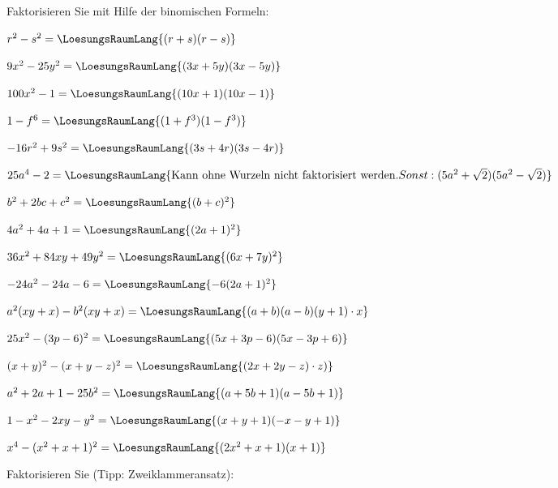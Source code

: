 

Faktorisieren Sie mit Hilfe der binomischen Formeln:


\begin{bbwAufgabenBlock}
\item $r^2-s^2 = \LoesungsRaumLang{(r+s)(r-s)}$
\item $9x^2 - 25y^2 = \LoesungsRaumLang{(3x+5y)(3x-5y)}$
\item $100x^2 -1 = \LoesungsRaumLang{(10x+1)(10x-1)}$
\item $1-f^6 = \LoesungsRaumLang{(1+f^3)(1-f^3)}$
\item $-16r^2 + 9s^2 = \LoesungsRaumLang{(3s+4r)(3s-4r)}$
\item $25a^4-2 =  \LoesungsRaumLang{\textrm{Kann ohne Wurzeln nicht faktorisiert werden}. Sonst: (5a^2 + \sqrt{2})(5a^2-\sqrt{2})}$
\item $b^2+2bc+c^2 = \LoesungsRaumLang{(b+c)^2}$
\item $4a^2+4a+1 = \LoesungsRaumLang{(2a+1)^2}$
\item $36x^2 + 84xy + 49y^2 = \LoesungsRaumLang{(6x+7y)^2}$
\item $-24a^2 - 24a -6 = \LoesungsRaumLang{-6(2a+1)^2}$
\item $a^2(xy+x) - b^2(xy+x) = \LoesungsRaumLang{(a+b)(a-b)(y+1)\cdot{}x}$
\item $25x^2 - (3p-6)^2 = \LoesungsRaumLang{(5x+3p-6)(5x-3p+6)}$
\item $(x+y)^2 - (x+y-z)^2 = \LoesungsRaumLang{(2x+2y-z)\cdot{}z)}$
\item $a^2+2a+1-25b^2 = \LoesungsRaumLang{(a+5b+1)(a-5b+1)}$
\item $1-x^2-2xy-y^2 = \LoesungsRaumLang{(x+y+1)(-x-y+1)}$
\item $x^4 - (x^2+x+1)^2 = \LoesungsRaumLang{(2x^2+x+1)(x+1)}$
\end{bbwAufgabenBlock}

\platzFuerBerechnungenBisEndeSeite{}





Faktorisieren Sie (Tipp: Zweiklammeransatz):


